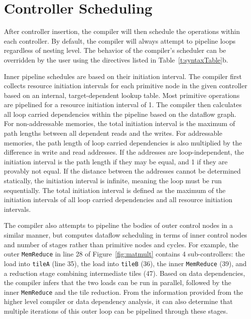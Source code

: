 

\section{Controller Scheduling}
\label{scheduling}
After controller insertion, the compiler will then schedule the operations within each controller.
By default, the compiler will always attempt to pipeline loops regardless of nesting level.
The behavior of the compiler's scheduler can be overridden by the user using the directives listed in Table~\ref{t:syntaxTable}b.

Inner pipeline schedules are based on their initiation interval.
The compiler first collects resource initiation intervals for each primitive node in the given controller based on an internal, target-dependent lookup table.
Most primitive operations are pipelined for a resource initiation interval of 1.
The compiler then calculates all loop carried dependencies within the pipeline based on the dataflow graph.
For non-addressable memories, the total initiation interval is the maximum of path lengths between all dependent reads and the writes.
For addressable memories, the path length of loop carried dependencies is also multiplied by the difference in write and read addresses.
If the addresses are loop-independent, the initiation interval is the path length if they may be equal, and 1 if they are provably not equal. If the distance between the addresses cannot be determined statically, the initiation interval is infinite, meaning the loop must be run sequentially.
The total initiation interval is defined as the maximum of the initiation intervals of all loop carried dependencies and all resource initiation intervals.

The compiler also attempts to pipeline the bodies of outer control nodes in a similar manner, but computes dataflow scheduling in terms of inner control nodes and number of stages rather than primitive nodes and cycles. For example, the outer \texttt{\small{MemReduce}} in line 28 of Figure~\ref{fig:matmult} contains 4 sub-controllers: the load into \texttt{\small{tileA}} (line 35), the load into \texttt{\small{tileB}} (36), the inner \texttt{\small{MemReduce}} (39), and a reduction stage combining intermediate tiles (47). Based on data dependencies, the compiler infers that the two loads can be run in parallel, followed by the inner \texttt{\small{MemReduce}} and the tile reduction. From the information provided
from the higher level compiler or data dependency analysis, it can also determine
that multiple iterations of this outer loop can be pipelined through these stages.

